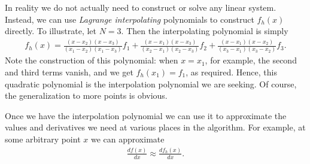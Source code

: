 \documentclass[12pt]{article}
\theoremstyle{definition}
\theoremstyle{definition}
\theoremstyle{definition}
\begin{document}
In reality we do not actually need to construct or solve any linear
system. Instead, we can use \emph{Lagrange interpolating} polynomials
to construct $f_h(x)$ directly. To illustrate, let $N=3$. Then the
interpolating polynomial is simply
\begin{align}
  f_h(x)
  =
  \frac{(x-x_2)(x-x_3)}{(x_1-x_2)(x_1-x_3)} f_1 
  +
  \frac{(x-x_1)(x-x_3)}{(x_2-x_1)(x_2-x_3)} f_2
  +
  \frac{(x-x_1)(x-x_2)}{(x_3-x_1)(x_3-x_2)} f_3.
\end{align}
Note the construction of this polynomial: when $x=x_1$, for example,
the second and third terms vanish, and we get $f_h(x_1) = f_1$, as
required. Hence, this quadratic polynomial is the interpolation
polynomial we are seeking. Of course, the generalization to more
points is obvious.

Once we have the interpolation polynomial we can use it to approximate
the values and derivatives we need at various places in the
algorithm. For example, at some arbitrary point $x$ we can approximate
\begin{align}
  \frac{df(x)}{dx} \approx \frac{df_h(x)}{dx}.
\end{align}
\end{document}
